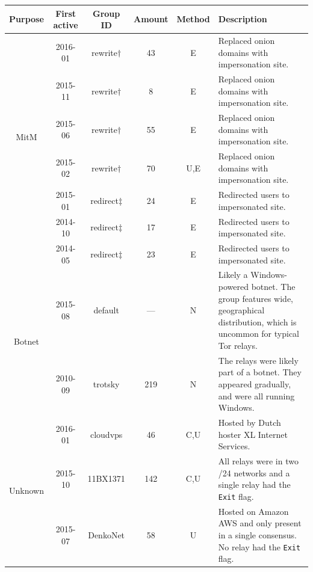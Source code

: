 \begin{table}[t]
\small
\centering
\begin{tabularx}{\textwidth}{c|c c c c X}
\hline
\textbf{Purpose} & \textbf{First active} & \textbf{Group ID} & \textbf{Amount} &
\textbf{Method} & \textbf{Description} \\
\hline
\multirow{6}{*}{MitM}
& 2016-01 & rewrite$\dagger$ & 43 & E & Replaced onion domains with
impersonation site. \\

& 2015-11 & rewrite$\dagger$ & 8 & E & Replaced onion domains with impersonation
site. \\

& 2015-06 & rewrite$\dagger$ & 55 & E & Replaced onion domains with impersonation
site. \\

& 2015-02 & rewrite$\dagger$ & 70 & U,E & Replaced onion domains with impersonation
site. \\

& 2015-01 & redirect$\ddagger$ & 24 & E & Redirected users to impersonated site.
\\

& 2014-10 & redirect$\ddagger$ & 17 & E & Redirected users to impersonated site.
\\

& 2014-05 & redirect$\ddagger$ & 23 & E & Redirected users to impersonated site.
\\

\hline

\multirow{2}{*}{Botnet}
& 2015-08 & default & --- & N & Likely a Windows-powered botnet.  The group features
wide, geographical distribution, which is uncommon for typical Tor relays. \\

& 2010-09 & trotsky & 219 & N & The relays were likely part of a botnet.  They
appeared gradually, and were all running Windows. \\

\hline

\multirow{5}{*}{Unknown}
& 2016-01 & cloudvps & 46 & C,U & Hosted by Dutch hoster XL Internet Services. \\

& 2015-10 & 11BX1371 & 142 & C,U & All relays were in two /24 networks and a single
relay had the \texttt{Exit} flag.  \\

& 2015-07 & DenkoNet & 58 & U & Hosted on Amazon AWS and only present in a single
consensus.  No relay had the \texttt{Exit} flag. \\


\end{tabularx}
\end{table}
